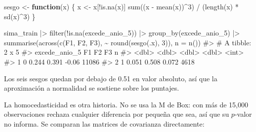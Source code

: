 \documentclass[
  spanish,
  letterpaper,
  DIV=11,
  numbers=noendperiod]{scrartcl}
\newenvironment{Shaded}{\begin{snugshade}}{\end{snugshade}}
\newcommand{\AttributeTok}[1]{\textcolor[rgb]{0.40,0.45,0.13}{#1}}
\newcommand{\CommentTok}[1]{\textcolor[rgb]{0.37,0.37,0.37}{#1}}
\newcommand{\ControlFlowTok}[1]{\textcolor[rgb]{0.00,0.23,0.31}{\textbf{#1}}}
\newcommand{\DecValTok}[1]{\textcolor[rgb]{0.68,0.00,0.00}{#1}}
\newcommand{\FunctionTok}[1]{\textcolor[rgb]{0.28,0.35,0.67}{#1}}
\newcommand{\NormalTok}[1]{\textcolor[rgb]{0.00,0.23,0.31}{#1}}
\newcommand{\OtherTok}[1]{\textcolor[rgb]{0.00,0.23,0.31}{#1}}
\newcommand{\SpecialCharTok}[1]{\textcolor[rgb]{0.37,0.37,0.37}{#1}}
\begin{document}
\begin{Shaded}
\begin{Highlighting}[]
\NormalTok{sesgo }\OtherTok{\textless{}{-}} \ControlFlowTok{function}\NormalTok{(x) \{}
\NormalTok{    x }\OtherTok{\textless{}{-}}\NormalTok{ x[}\SpecialCharTok{!}\FunctionTok{is.na}\NormalTok{(x)]}
    \FunctionTok{sum}\NormalTok{((x }\SpecialCharTok{{-}} \FunctionTok{mean}\NormalTok{(x))}\SpecialCharTok{\^{}}\DecValTok{3}\NormalTok{) }\SpecialCharTok{/}\NormalTok{ (}\FunctionTok{length}\NormalTok{(x) }\SpecialCharTok{*} \FunctionTok{sd}\NormalTok{(x)}\SpecialCharTok{\^{}}\DecValTok{3}\NormalTok{)}
\NormalTok{\}}

\NormalTok{sima\_train }\SpecialCharTok{|\textgreater{}}
    \FunctionTok{filter}\NormalTok{(}\SpecialCharTok{!}\FunctionTok{is.na}\NormalTok{(excede\_anio\_5)) }\SpecialCharTok{|\textgreater{}}
    \FunctionTok{group\_by}\NormalTok{(excede\_anio\_5) }\SpecialCharTok{|\textgreater{}}
    \FunctionTok{summarise}\NormalTok{(}\FunctionTok{across}\NormalTok{(}\FunctionTok{c}\NormalTok{(F1, F2, F3), }\SpecialCharTok{\textasciitilde{}} \FunctionTok{round}\NormalTok{(}\FunctionTok{sesgo}\NormalTok{(.x), }\DecValTok{3}\NormalTok{)), }\AttributeTok{n =} \FunctionTok{n}\NormalTok{())}
\CommentTok{\#\textgreater{} \# A tibble: 2 x 5}
\CommentTok{\#\textgreater{}   excede\_anio\_5    F1    F2     F3     n}
\CommentTok{\#\textgreater{}           \textless{}dbl\textgreater{} \textless{}dbl\textgreater{} \textless{}dbl\textgreater{}  \textless{}dbl\textgreater{} \textless{}int\textgreater{}}
\CommentTok{\#\textgreater{} 1             0 0.244 0.391 {-}0.06  11086}
\CommentTok{\#\textgreater{} 2             1 0.051 0.508  0.072  4618}
\end{Highlighting}
\end{Shaded}

Los seis sesgos quedan por debajo de 0.51 en valor absoluto, así que la
aproximación a normalidad se sostiene sobre los puntajes.

La homocedasticidad es otra historia. No se usa la M de Box: con más de
15,000 observaciones rechaza cualquier diferencia por pequeña que sea,
así que su \(p\)-valor no informa. Se comparan las matrices de
covarianza directamente:
\end{document}
